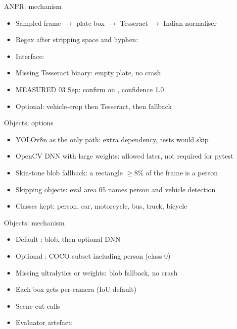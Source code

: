 \documentclass[aspectratio=169,11pt]{beamer}
\begin{document}
\begin{frame}{ANPR: mechanism}
\begin{itemize}\itemsep0.55em
\item Sampled frame $\to$ plate box $\to$ Tesseract $\to$ Indian normaliser
\item Regex after stripping space and hyphen: 
\item Interface: 
\item Missing Tesseract binary: empty plate, no crash
\item MEASURED 03 Sep: confirm on , confidence 1.0
\item Optional:  vehicle-crop then Tesseract, then fallback
\end{itemize}
\end{frame}

\begin{frame}{Objects: options}
\begin{itemize}\itemsep0.55em
\item YOLOv8n as the only path: extra dependency, tests would skip
\item OpenCV DNN with large weights: allowed later, not required for pytest
\item Skin-tone blob fallback: a rectangle $\ge 8\%$ of the frame is a person
\item Skipping objects: eval area 05 names person and vehicle detection
\item Classes kept: person, car, motorcycle, bus, truck, bicycle
\end{itemize}
\end{frame}

\begin{frame}{Objects: mechanism}
\begin{itemize}\itemsep0.55em
\item Default : blob, then optional DNN
\item Optional : COCO subset including person (class 0)
\item Missing ultralytics or weights: blob fallback, no crash
\item Each box gets per-camera  (IoU default)
\item Scene cut calls 
\item Evaluator artefact: 
\end{itemize}
\end{frame}
\end{document}

